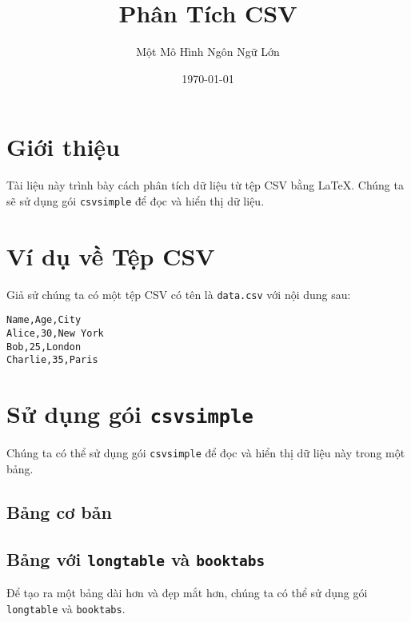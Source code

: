 \documentclass{article}
\begin{document}
\title{Phân Tích CSV}
\author{Một Mô Hình Ngôn Ngữ Lớn}
\date{\today}

\maketitle

\section{Giới thiệu}

Tài liệu này trình bày cách phân tích dữ liệu từ tệp CSV bằng \LaTeX. Chúng ta sẽ sử dụng gói \texttt{csvsimple} để đọc và hiển thị dữ liệu.

\section{Ví dụ về Tệp CSV}

Giả sử chúng ta có một tệp CSV có tên là \texttt{data.csv} với nội dung sau:

\begin{verbatim}
Name,Age,City
Alice,30,New York
Bob,25,London
Charlie,35,Paris
\end{verbatim}

\section{Sử dụng gói \texttt{csvsimple}}

Chúng ta có thể sử dụng gói \texttt{csvsimple} để đọc và hiển thị dữ liệu này trong một bảng.

\subsection{Bảng cơ bản}

\begin{center}
\end{center}

\subsection{Bảng với \texttt{longtable} và \texttt{booktabs}}

Để tạo ra một bảng dài hơn và đẹp mắt hơn, chúng ta có thể sử dụng gói \texttt{longtable} và \texttt{booktabs}.
\end{document}
